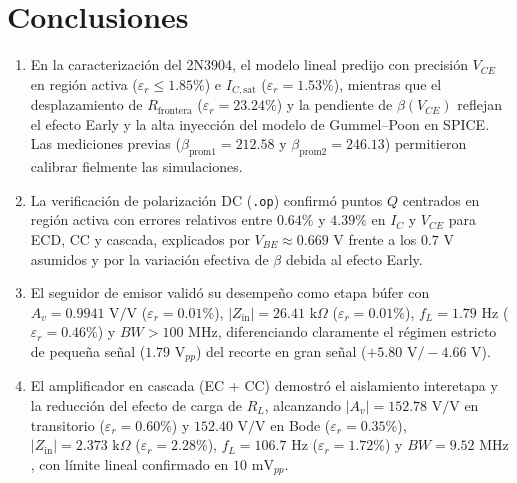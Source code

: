 \documentclass[conference]{IEEEtran}
\begin{document}
\section{Conclusiones}

\begin{enumerate}
\item En la caracterizaci\'on del 2N3904, el modelo lineal predijo con precisi\'on $V_{CE}$ en regi\'on activa ($\varepsilon_r \le 1.85\%$) e $I_{C,\mathrm{sat}}$ ($\varepsilon_r = 1.53\%$), mientras que el desplazamiento de $R_{\mathrm{frontera}}$ ($\varepsilon_r = 23.24\%$) y la pendiente de $\beta(V_{CE})$ reflejan el efecto Early y la alta inyecci\'on del modelo de Gummel--Poon en SPICE. Las mediciones previas ($\beta_{\mathrm{prom1}} = 212.58$ y $\beta_{\mathrm{prom2}} = 246.13$) permitieron calibrar fielmente las simulaciones.
\item La verificaci\'on de polarizaci\'on DC (\texttt{.op}) confirm\'o puntos $Q$ centrados en regi\'on activa con errores relativos entre $0.64\%$ y $4.39\%$ en $I_C$ y $V_{CE}$ para ECD, CC y cascada, explicados por $V_{BE} \approx 0.669\text{ V}$ frente a los $0.7\text{ V}$ asumidos y por la variaci\'on efectiva de $\beta$ debida al efecto Early.
\item El seguidor de emisor valid\'o su desempe\~no como etapa b\'ufer con $A_v = 0.9941\text{ V/V}$ ($\varepsilon_r = 0.01\%$), $|Z_{\mathrm{in}}| = 26.41\text{ k}\Omega$ ($\varepsilon_r = 0.01\%$), $f_L = 1.79\text{ Hz}$ ($\varepsilon_r = 0.46\%$) y $BW > 100\text{ MHz}$, diferenciando claramente el r\'egimen estricto de peque\~na se\~nal ($1.79\text{ V}_{pp}$) del recorte en gran se\~nal ($+5.80\text{ V}/-4.66\text{ V}$).
\item El amplificador en cascada (EC + CC) demostr\'o el aislamiento interetapa y la reducci\'on del efecto de carga de $R_L$, alcanzando $|A_v| = 152.78\text{ V/V}$ en transitorio ($\varepsilon_r = 0.60\%$) y $152.40\text{ V/V}$ en Bode ($\varepsilon_r = 0.35\%$), $|Z_{\mathrm{in}}| = 2.373\text{ k}\Omega$ ($\varepsilon_r = 2.28\%$), $f_L = 106.7\text{ Hz}$ ($\varepsilon_r = 1.72\%$) y $BW = 9.52\text{ MHz}$, con l\'imite lineal confirmado en $10\text{ mV}_{pp}$.
\end{enumerate}
\end{document}

